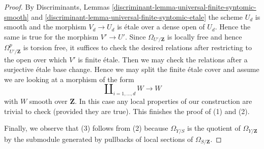 \documentclass[10pt,a4paper]{amsart}
\theoremstyle{plain}
\theoremstyle{definition}
\theoremstyle{remark}
\numberwithin{equation}{subsection}
\begin{document}
\begin{proof}
\medskip\noindent
By Discriminants, Lemmas
\ref{discriminant-lemma-universal-finite-syntomic-smooth} and
\ref{discriminant-lemma-universal-finite-syntomic-etale}
the scheme $U_d$ is smooth and the morphism $V_d \to U_d$
is \'etale over a dense open of $U_d$.
Hence the same is true for the morphism
$V' \to U'$. Since $\Omega_{U'/\mathbf{Z}}$ is locally free and hence
$\Omega^p_{U'/\mathbf{Z}}$ is torsion
free, it suffices to check the desired relations
after restricting to the open over which $V'$ is finite \'etale.
Then we may check the relations after a surjective \'etale
base change. Hence we may split the finite \'etale cover
and assume we are looking at a morphism of the form
$$
\coprod\nolimits_{i = 1, \ldots, d} W \longrightarrow W
$$
with $W$ smooth over $\mathbf{Z}$.
In this case any local properties of our construction are trivial to check
(provided they are true). This finishes the proof of (1) and (2).

\medskip\noindent
Finally, we observe that (3) follows from (2) because $\Omega_{Y/S}$
is the quotient of $\Omega_{Y/\mathbf{Z}}$ by the submodule
generated by pullbacks of local sections of $\Omega_{S/\mathbf{Z}}$.
\end{proof}
\end{document}
